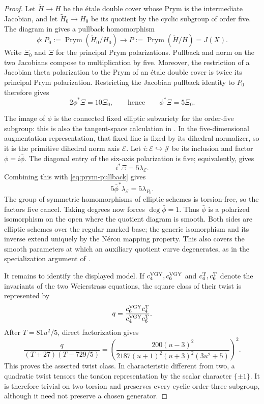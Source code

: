 \documentclass[11pt]{article}
\numberwithin{equation}{section}
\theoremstyle{definition}
\theoremstyle{remark}
\begin{document}
\begin{proof}
Let \(\widetilde H\to H\) be the étale double cover whose Prym is the
intermediate Jacobian, and let
\(\widetilde H_0\to H_0\) be its quotient by the cyclic subgroup of order
five.  The diagram in \cite[Section~3.2]{VGY} gives a pullback homomorphism
\[
 \phi:P_0:=\operatorname{Prym}(\widetilde H_0/H_0)\longrightarrow
 P:=\operatorname{Prym}(\widetilde H/H)=J(X).
\]
Write \(\Xi_0\) and \(\Xi\) for the principal Prym polarizations.  Pullback
and norm on the two Jacobians compose to multiplication by five.  Moreover,
the restriction of a Jacobian theta polarization to the Prym of an étale
double cover is twice its principal Prym polarization.  Restricting the
Jacobian pullback identity to \(P_0\) therefore gives
\begin{equation}\label{eq:prym-pullback}
 2\phi^*\Xi=10\Xi_0,
 \qquad\text{hence}\qquad
 \phi^*\Xi=5\Xi_0.
\end{equation}

The image of \(\phi\) is the connected fixed elliptic subvariety for the
order-five subgroup: this is also the tangent-space calculation in
\cite[Proposition~3.2]{VGY}.  In the five-dimensional augmentation
representation, that fixed line is fixed by its dihedral normalizer, so it is
the primitive dihedral norm axis \(\mathcal E\).  Let
\(i:\mathcal E\hookrightarrow\mathcal J\) be its inclusion and factor
\(\phi=i\bar\phi\).  The diagonal entry of the six-axis polarization is five;
equivalently, \cite[Generic six-axis polarization and Relative six-axis
source]{RuddEpilogue} gives
\[
 i^*\Xi=5\lambda_{\mathcal E}.
\]
Combining this with \eqref{eq:prym-pullback} gives
\[
 5\bar\phi^*\lambda_{\mathcal E}=5\lambda_{P_0}.
\]
The group of symmetric homomorphisms of elliptic schemes is torsion-free, so
the factors five cancel.  Taking degrees now forces
\(\deg\bar\phi=1\).  Thus \(\bar\phi\) is a polarized isomorphism on the open
where the quotient diagram is smooth.  Both sides are elliptic schemes over
the regular marked base; the generic isomorphism and its inverse extend
uniquely by the Néron mapping property.  This also covers the smooth
parameters at which an auxiliary quotient curve degenerates, as in the
specialization argument of \cite[Proposition~3.2]{VGY}.

It remains to identify the displayed model.  If \(c_4^{\rm VGY},c_6^{\rm
VGY}\) and \(c_4^{\rm T},c_6^{\rm T}\) denote the invariants of the two
Weierstrass equations, the square class of their twist is represented by
\[
 q=\frac{c_6^{\rm VGY}c_4^{\rm T}}
         {c_4^{\rm VGY}c_6^{\rm T}}.
\]
After \(T=81u^2/5\), direct factorization gives
\[
 \frac{q}{(T+27)(T-729/5)}=
 \left(
  \frac{200(u-3)^2}
  {2187(u+1)^2(u+3)^2(3u^2+5)}
 \right)^2.
\]
This proves the asserted twist class.  In characteristic different from two,
a quadratic twist tensors the torsion representation by the scalar character
\(\{\pm1\}\).  It is therefore trivial on two-torsion and preserves every
cyclic order-three subgroup, although it need not preserve a chosen generator.
\end{proof}
\end{document}
